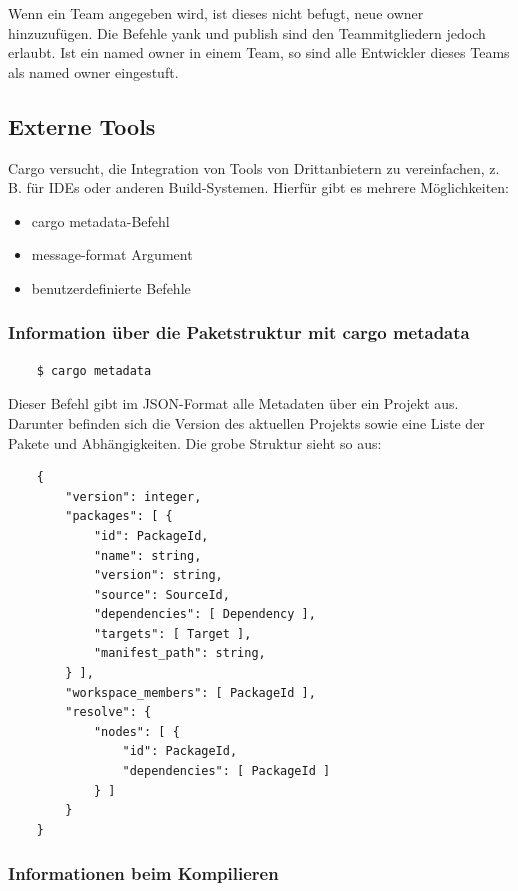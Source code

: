 Wenn ein Team angegeben wird, ist dieses nicht befugt, neue \glqq owner\grqq{} hinzuzufügen. Die Befehle yank und publish sind den Teammitgliedern jedoch erlaubt. Ist ein \glqq named owner\grqq{} in einem Team, so sind alle Entwickler dieses Teams als \glqq named owner\grqq{} eingestuft.

\subsection{Externe Tools}

Cargo versucht, die Integration von Tools von Drittanbietern zu vereinfachen, z. B. für IDEs oder anderen Build-Systemen. Hierfür gibt es mehrere Möglichkeiten:

\begin{itemize}
    \item cargo metadata-Befehl
    \item message-format Argument
    \item benutzerdefinierte Befehle
\end{itemize}

\subsubsection{Information über die Paketstruktur mit cargo metadata}

\begin{lstlisting}
    $ cargo metadata
\end{lstlisting}

Dieser Befehl gibt im JSON-Format alle Metadaten über ein Projekt aus. Darunter befinden sich die Version des aktuellen Projekts sowie eine Liste der Pakete und Abhängigkeiten. Die grobe Struktur sieht so aus:

\begin{lstlisting}
    {
        "version": integer,
        "packages": [ {
            "id": PackageId,
            "name": string,
            "version": string,
            "source": SourceId,
            "dependencies": [ Dependency ],
            "targets": [ Target ],
            "manifest_path": string,
        } ],
        "workspace_members": [ PackageId ],
        "resolve": {
            "nodes": [ {
                "id": PackageId,
                "dependencies": [ PackageId ]
            } ]
        }
    }
\end{lstlisting}

\subsubsection{Informationen beim Kompilieren}

